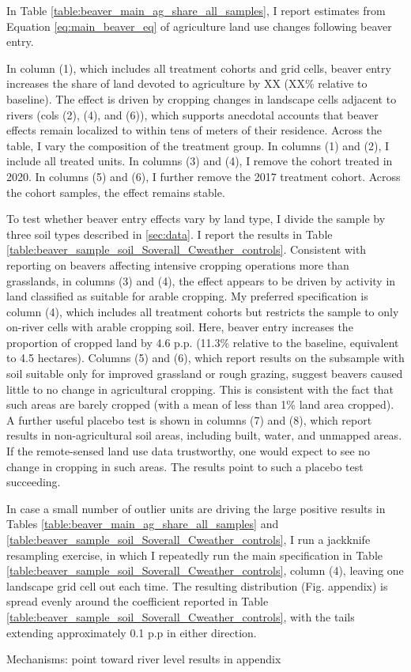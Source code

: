 In Table \ref{table:beaver_main_ag_share_all_samples}, I report estimates from Equation \ref{eq:main_beaver_eq} of agriculture land use changes following beaver entry. 

In column (1), which includes all treatment cohorts and grid cells, beaver entry increases the share of land devoted to agriculture by XX (XX\% relative to baseline). The effect is driven by cropping changes in landscape cells adjacent to rivers (cols (2), (4), and (6)), which supports anecdotal accounts that beaver effects remain localized to within tens of meters of their residence. Across the table, I vary the composition of the treatment group. In columns (1) and (2), I include all treated units. In columns (3) and (4), I remove the cohort treated in 2020. In columns (5) and (6), I further remove the 2017 treatment cohort. Across the cohort samples, the effect remains stable. 



To test whether beaver entry effects vary by land type, I divide the sample by three soil types described in \ref{sec:data}. I report the results in Table \ref{table:beaver_sample_soil_Soverall_Cweather_controls}. Consistent with reporting on beavers affecting intensive cropping operations more than grasslands, in columns (3) and (4), the effect appears to be driven by activity in land classified as suitable for arable cropping. My preferred specification is column (4), which includes all treatment cohorts but restricts the sample to only on-river cells with arable cropping soil. Here, beaver entry increases the proportion of cropped land by 4.6 p.p. (11.3\% relative to the baseline, equivalent to 4.5 hectares). Columns (5) and (6), which report results on the subsample with soil suitable only for improved grassland or rough grazing, suggest beavers caused little to no change in agricultural cropping. This is consistent with the fact that such areas are barely cropped (with a mean of less than 1\% land area cropped). A further useful placebo test is shown in columns (7) and (8), which report results in non-agricultural soil areas, including built, water, and unmapped areas. If the remote-sensed land use data trustworthy, one would expect to see no change in cropping in such areas. The results point to such a placebo test succeeding. 



In case a small number of outlier units are driving the large positive results in Tables \ref{table:beaver_main_ag_share_all_samples} and \ref{table:beaver_sample_soil_Soverall_Cweather_controls}, I run a jackknife resampling exercise, in which I repeatedly run the main specification in Table \ref{table:beaver_sample_soil_Soverall_Cweather_controls}, column (4), leaving one landscape grid cell out each time. The resulting distribution (Fig. appendix) is spread evenly around the coefficient reported in Table \ref{table:beaver_sample_soil_Soverall_Cweather_controls}, with the tails extending approximately 0.1 p.p in either direction. 


Mechanisms: point toward river level results in appendix

